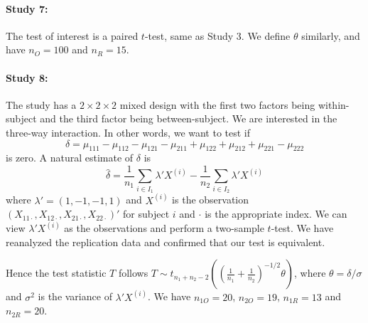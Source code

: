 \documentclass[11pt]{article}
\theoremstyle{definition}
\theoremstyle{custom}
\newcommand{\hdelta}{\hat{\delta}}
\begin{document}
  \paragraph{Study 7: \citet{Beaman:2008df}} The test of interest is a paired $t$-test, same as Study 3. We define $\theta$ similarly, and have $n_O = 100$ and $n_R = 15$.

  \paragraph{Study 8: \citet{Dodson:2008ks}}
  The study has a $2 \times 2 \times 2$ mixed design with the first two factors being within-subject and the third factor being between-subject. We are interested in the three-way interaction. In other words, we want to test if
  \[
  \delta = \mu_{111} - \mu_{112} - \mu_{121} - \mu_{211} + \mu_{122} + \mu_{212} + \mu_{221} - \mu_{222}
  \]
  is zero. A natural estimate of $\delta$ is
  \[
  \hdelta = \frac{1}{n_1} \sum_{i \in I_1} \lambda' X^{(i)} - \frac{1}{n_2} \sum_{i \in I_2} \lambda' X^{(i)}
  \]
  where $\lambda' = (1, -1, -1, 1)$ and $X^{(i)}$ is the observation $(X_{11 \cdot}, X_{12 \cdot}, X_{21 \cdot}, X_{22 \cdot})'$ for subject $i$ and $\cdot$ is the appropriate index. We can view $\lambda' X^{(i)}$ as the observations and perform a two-sample $t$-test. We have reanalyzed the replication data and confirmed that our test is equivalent.

  Hence the test statistic $T$ follows $T \sim t_{n_1 + n_2 - 2}\left(\left(\frac{1}{n_1} + \frac{1}{n_2}\right)^{-1/2} \theta\right)$, where $\theta = \delta / \sigma$ and $\sigma^2$ is the variance of $\lambda' X^{(i)}$. We have $n_{1O} = 20$, $n_{2O} = 19$, $n_{1R} = 13$ and $n_{2R} = 20$.
\end{document}
